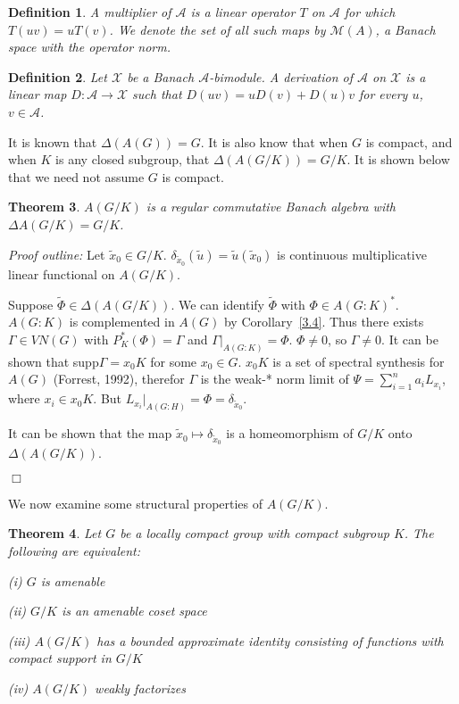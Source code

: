 \documentclass[12 pt]{article}
\newcommand\done{\begin{flushright}$\Box$\end{flushright}}
\newtheorem{defn}{Definition}
\newtheorem{theorem}[defn]{Theorem}
\begin{document}
\begin{defn}
A multiplier of $\mathcal{A}$ is a linear operator $T$ on $\mathcal{A}$ for which $T(uv) = uT(v)$.
We denote the set of all such maps by $\mathcal{M}(A)$, a Banach space with the operator norm.
\end{defn}

\begin{defn}
Let $\mathcal{X}$ be a Banach $\mathcal{A}$-bimodule.  A derivation of $\mathcal{A}$ on $\mathcal{X}$
is a linear map $D: \mathcal{A} \rightarrow \mathcal{X}$ such that $D(uv) = uD(v) + D(u)v$ for every
$u$, $v \in\mathcal{A}$.
\end{defn}


It is known that $\Delta(A(G)) = G$.  It is also know that when $G$ is compact, and
when $K$ is any closed subgroup, that $\Delta(A(G/K)) = G/K$.  It is shown below
that we need not assume $G$ is compact.
\begin{theorem}
$A(G/K)$ is a regular commutative Banach algebra with $\Delta A(G/K) = G/K$.
\end{theorem}
{\it Proof outline:}
Let $\tilde{x}_0 \in G/K$.  $\delta_{\tilde{x}_0} (\tilde{u}) = \tilde{u}(\tilde{x}_0)$ is
continuous multiplicative linear functional on $A(G/K)$.

Suppose $\tilde{\Phi} \in \Delta(A(G/K))$.  We can identify $\tilde{\Phi}$ with $\Phi \in A(G:K)^*$.
$A(G:K)$ is complemented in $A(G)$ by Corollary~\ref{3.4}.  Thus there exists $\Gamma \in VN(G)$
with $P^*_K (\Phi) = \Gamma$ and $\Gamma |_{A(G:K)} = \Phi$.  $\Phi \neq 0$, so $\Gamma \neq 0$.
It can be shown that supp$\Gamma = x_0 K$ for some $x_0 \in G$.  $x_0 K$ is a set of spectral synthesis
for $A(G)$ (Forrest, 1992), therefor $\Gamma$ is the weak-* norm limit of $\Psi = \sum_{i=1}^n a_i L_{x_i}$,
where $x_i \in x_0 K$.  But $L_{x_i} |_{A(G:H)} = \Phi = \delta_{\tilde{x}_0}$.

It can be shown that the map $\tilde{x}_0 \mapsto \delta_{\tilde{x}_0}$ is a homeomorphism
of $G/K$ onto $\Delta(A(G/K))$.\done


We now examine some structural properties of $A(G/K)$.


\begin{theorem}\label{4.2}
Let $G$ be a locally compact group with compact subgroup $K$.  The following are equivalent:
\begin{list}{}{\topsep -4pt \itemsep -4pt}
\item[(i)] $G$ is amenable
\item[(ii)] $G/K$ is an amenable coset space
\item[(iii)] $A(G/K)$ has a bounded approximate identity consisting of functions with compact support in $G/K$
\item[(iv)] $A(G/K)$ weakly factorizes
\end{list}
\end{theorem}
\end{document}
